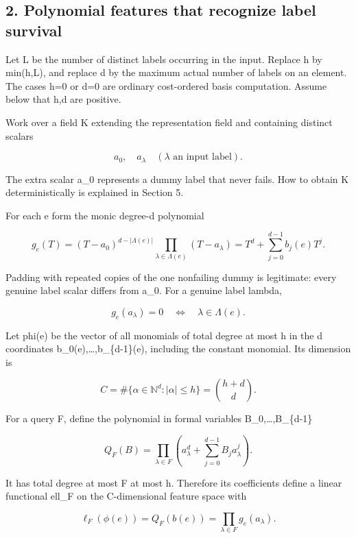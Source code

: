 \hypertarget{af-7a1626f5ae-polynomial-features-that-recognize-label-survival}{%
\subsection{2. Polynomial features that recognize label survival}\label{af-7a1626f5ae-polynomial-features-that-recognize-label-survival}}

Let L be the number of distinct labels occurring in the input. Replace h by min(h,L), and replace d by the maximum actual number of labels on an element. The cases h=0 or d=0 are ordinary cost-ordered basis computation. Assume below that h,d are positive.

Work over a field K extending the representation field and containing distinct scalars

\[
a_0,\quad a_\lambda\quad(\lambda\text{ an input label}).
\]

The extra scalar a\_0 represents a dummy label that never fails. How to obtain K deterministically is explained in Section 5.

For each e form the monic degree-d polynomial

\[
g_e(T)=(T-a_0)^{d-|\Lambda(e)|}
          \prod_{\lambda\in\Lambda(e)}(T-a_\lambda)
       =T^d+\sum_{j=0}^{d-1}b_j(e)T^j.
 \tag{4}
\]

Padding with repeated copies of the one nonfailing dummy is legitimate: every genuine label scalar differs from a\_0. For a genuine label lambda,

\[
g_e(a_\lambda)=0
 \quad\Longleftrightarrow\quad
 \lambda\in\Lambda(e).
 \tag{5}
\]

Let phi(e) be the vector of all monomials of total degree at most h in the d coordinates b\_0(e),\ldots,b\_\{d-1\}(e), including the constant monomial. Its dimension is

\[
C=\#\{\alpha\in\mathbb N^d:|\alpha|\le h\}
   =\binom{h+d}{d}.
 \tag{6}
\]

For a query F, define the polynomial in formal variables B\_0,\ldots,B\_\{d-1\}

\[
Q_F(B)=\prod_{\lambda\in F}
          \left(a_\lambda^d+\sum_{j=0}^{d-1}B_j a_\lambda^j\right).
 \tag{7}
\]

It has total degree at most \textbar F\textbar{} at most h. Therefore its coefficients define a linear functional ell\_F on the C-dimensional feature space with

\[
\ell_F(\phi(e))=Q_F(b(e))
     =\prod_{\lambda\in F}g_e(a_\lambda).
 \tag{8}
\]

